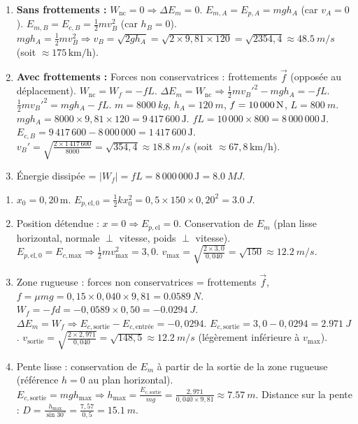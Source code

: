 \documentclass[11pt]{article}
\begin{document}
\begin{corrige}
\begin{enumerate}
    \item \textbf{Sans frottements :} $W_{\text{nc}} = 0 \Rightarrow \Delta E_m = 0$.
    $E_{m,A} = E_{p,A} = mgh_A$ (car $v_A=0$).
    $E_{m,B} = E_{c,B} = \frac{1}{2}mv_B^2$ (car $h_B=0$).
    $mgh_A = \frac{1}{2}mv_B^2 \Rightarrow v_B = \sqrt{2gh_A} = \sqrt{2 \times 9,81 \times 120} = \sqrt{2354,4} \approx \SI{48,5}{m/s}$ (soit $\approx 175\,\text{km/h}$).
    \item \textbf{Avec frottements :} Forces non conservatrices : frottements $\vec{f}$ (opposée au déplacement). $W_{\text{nc}} = W_f = -fL$.
    $\Delta E_m = W_{\text{nc}} \Rightarrow \frac{1}{2}mv_B'^2 - mgh_A = -fL$.
    $\frac{1}{2}mv_B'^2 = mgh_A - fL$.
    $m = \SI{8000}{kg}$, $h_A = \SI{120}{m}$, $f = \SI{10\,000}{N}$, $L = \SI{800}{m}$.
    $mgh_A = 8000 \times 9,81 \times 120 = 9\,417\,600\,\text{J}$.
    $fL = 10\,000 \times 800 = 8\,000\,000\,\text{J}$.
    $E_{c,B} = 9\,417\,600 - 8\,000\,000 = 1\,417\,600\,\text{J}$.
    $v_B' = \sqrt{\frac{2 \times 1\,417\,600}{8000}} = \sqrt{354,4} \approx \SI{18,8}{m/s}$ (soit $\approx 67,8\,\text{km/h}$).
    \item Énergie dissipée = $|W_f| = fL = 8\,000\,000\,\text{J} = \SI{8,0}{MJ}$.
\end{enumerate}
\end{corrige}

\begin{corrige}
\begin{enumerate}
    \item $x_0 = 0,20\,\text{m}$. $E_{p,\text{el},0} = \frac{1}{2}k x_0^2 = 0,5 \times 150 \times 0,20^2 = \SI{3,0}{J}$.
    \item Position détendue : $x=0 \Rightarrow E_{p,\text{el}}=0$. Conservation de $E_m$ (plan lisse horizontal, normale $\perp$ vitesse, poids $\perp$ vitesse).
    $E_{p,\text{el},0} = E_{c,\text{max}} \Rightarrow \frac{1}{2}mv_{\text{max}}^2 = 3,0$.
    $v_{\text{max}} = \sqrt{\frac{2 \times 3,0}{0,040}} = \sqrt{150} \approx \SI{12,2}{m/s}$.
    \item Zone rugueuse : forces non conservatrices = frottements $\vec{f}$, $f = \mu mg = 0,15 \times 0,040 \times 9,81 = \SI{0,0589}{N}$.
    $W_f = -f d = -0,0589 \times 0,50 = -\SI{0,0294}{J}$.
    $\Delta E_m = W_f \Rightarrow E_{c,\text{sortie}} - E_{c,\text{entrée}} = -0,0294$.
    $E_{c,\text{sortie}} = 3,0 - 0,0294 = \SI{2,971}{J}$.
    $v_{\text{sortie}} = \sqrt{\frac{2 \times 2,971}{0,040}} = \sqrt{148,5} \approx \SI{12,2}{m/s}$ (légèrement inférieure à $v_{\text{max}}$).
    \item Pente lisse : conservation de $E_m$ à partir de la sortie de la zone rugueuse (référence $h=0$ au plan horizontal).
    $E_{c,\text{sortie}} = mgh_{\text{max}} \Rightarrow h_{\text{max}} = \frac{E_{c,\text{sortie}}}{mg} = \frac{2,971}{0,040 \times 9,81} \approx \SI{7,57}{m}$.
    Distance sur la pente : $D = \frac{h_{\text{max}}}{\sin 30^\circ} = \frac{7,57}{0,5} = \SI{15,1}{m}$.
\end{enumerate}
\end{corrige}
\end{document}

